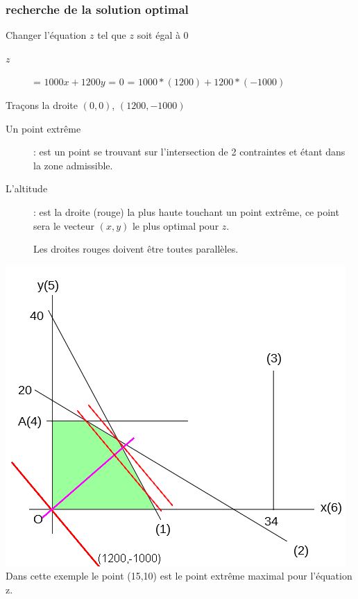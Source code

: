 \subsubsection{recherche de la solution optimal}

Changer l'équation $z$ tel que $z$ soit égal à $0$
\begin{description}
\item[$z$] = $1000x + 1200y$ = $0$ = $1000*(1200) + 1200 *(-1000)$
\end{description}
Traçons la droite $(0,0)$, $(1200,-1000)$
\begin{description}
\item[Un point extrême]: est un point se trouvant sur l'intersection de 2 contraintes et étant dans la zone admissible.
\item[L'altitude]: est la droite (rouge) la plus haute touchant un point extrême, ce point sera le vecteur $(x,y)$ le plus optimal pour $z$.
\item[] Les droites rouges doivent être toutes parallèles.
\end{description}
\includegraphics[scale=0.55]{img/ro-pl-2var_1.png} \\
Dans cette exemple le point (15,10) est le point extrême maximal pour l'équation z.\\

\pagebreak